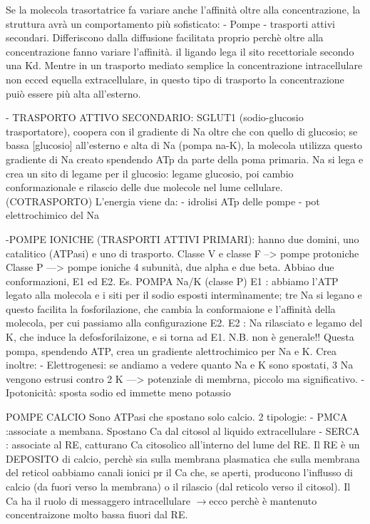 \documentclass[a4paper,12pt]{article}
\newcommand{\lfreccia}{\ensuremath{\longrightarrow}}
\begin{document}
Se la molecola trasortatrice fa variare anche l'affinità oltre alla concentrazione, la struttura avrà un comportamento più sofisticato:
- Pompe
- trasporti attivi secondari.
Differiscono dalla diffusione facilitata proprio perchè oltre alla concentrazione fanno variare l'affinità.
il ligando lega il sito recettoriale secondo una Kd. Mentre in un trasporto mediato semplice la concentrazione intracellulare non ecced equella extracellulare, in questo tipo di trasporto la concentrazione puiò essere più alta all'esterno.

- TRASPORTO ATTIVO SECONDARIO: SGLUT1 (sodio-glucosio trasportatore), coopera con il gradiente di Na oltre che con quello di glucosio; se bassa [glucosio] all'esterno e alta di Na (pompa na-K), la molecola utilizza questo gradiente di Na creato spendendo ATp da parte della poma primaria. Na si lega e crea un sito di legame per il glucosio: legame glucosio, poi cambio conformazionale e rilascio delle due molecole nel lume cellulare. (COTRASPORTO)
L'energia viene da:
- idrolisi ATp delle pompe
- pot elettrochimico del Na 

-POMPE IONICHE (TRASPORTI ATTIVI PRIMARI): hanno due domini, uno catalitico (ATPasi) e uno di trasporto.
Classe V e classe F --> pompe protoniche
Classe P ---> pompe ioniche
4 subunità, due alpha e due beta. Abbiao due conformazioni, E1 ed E2.
Es. POMPA Na/K (classe P)
E1 : abbiamo l'ATP legato alla molecola e i siti per il sodio esposti intermìnamente; tre Na si legano e questo facilita la fosforilazione, che cambia la conformaione e l'affinità della molecola, per cui passiamo alla configurazione E2.
E2 : Na rilasciato e legamo del K, che induce la defosforilaizone, e si torna ad E1.
N.B. non è generale!!
Questa pompa, spendendo ATP, crea un gradiente alettrochimico per Na e K. Crea inoltre:
- Elettrogenesi: se andiamo a vedere quanto Na e K sono spostati, 3 Na vengono estrusi contro 2 K ---> potenziale di membrna, piccolo ma significativo.
- Ipotonicità: sposta sodio ed immette meno potassio

POMPE CALCIO
Sono ATPasi che spostano solo calcio. 2 tipologie:
- PMCA :associate a membana. Spostano Ca dal citosol al liquido extracellulare
- SERCA : associate al RE, catturano Ca citosolico all'interno del lume del RE. Il RE è un DEPOSITO di calcio, perchè sia sulla membrana plasmatica che sulla membrana del reticol oabbiamo canali ionici pr il Ca che, se aperti, producono l'influsso di calcio (da fuori verso la membrana) o il rilascio (dal reticolo verso il citosol). 
Il Ca ha il ruolo di messaggero intracellulare \lfreccia ecco perchè è mantenuto  concentraizone molto bassa fiuori dal RE.
\end{document}
